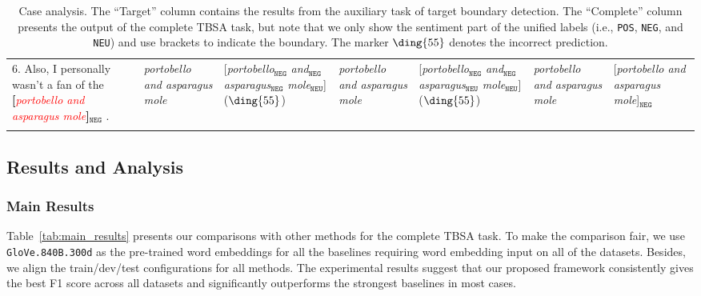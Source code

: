 \documentclass[letterpaper]{article} %
\newcommand{\xmark}{\ding{55}}
\begin{document}
\begin{table}[t]
{\begin{tabular}{@{}L{5.8cm}@{~}|@{~}L{1.8cm}@{~}|@{~}L{2.9cm}@{~}|@{~}L{1.8cm}@{~}|@{~}L{2.9cm}@{~}|@{~}L{1.8cm}@{~}|@{~}L{2.9cm}@{}}
        6. Also, I personally wasn't a fan of the \textbf{[}\textcolor{red}{\textit{portobello and asparagus mole}}\textbf{]}$_{\texttt{NEG}}$ . & \textit{portobello and asparagus mole} & [\textit{portobello}$_{\texttt{NEG}}$ \textit{and}$_{\texttt{NEG}}$ \textit{asparagus}$_{\texttt{NEG}}$ \textit{mole}$_{\texttt{NEU}}$] (${\text{\xmark}}$) & \textit{portobello and asparagus mole} & [\textit{portobello}$_{\texttt{NEG}}$ \textit{and}$_{\texttt{NEG}}$ \textit{asparagus}$_{\texttt{NEU}}$ \textit{mole}$_{\texttt{NEU}}$] (${\text{\xmark}}$) & \textit{portobello and asparagus mole} & [\textit{portobello and asparagus mole}]$_{\texttt{NEG}}$ \\
        \Xhline{3\arrayrulewidth}
    \end{tabular}}
    \caption{Case analysis. The ``Target'' column contains the results from the auxiliary task of target boundary detection. The ``Complete'' column presents the output of the complete TBSA task, but note that we only show the sentiment part of the unified labels (i.e., \texttt{POS}, \texttt{NEG}, and \texttt{NEU}) and use brackets to indicate the boundary. The marker ${\text{\xmark}}$ denotes the incorrect prediction. }
    \label{tab:case_study}
\end{table}

\subsection{Results and Analysis}
\subsubsection{Main Results}
Table~\ref{tab:main_results} presents our comparisons with other methods for the complete TBSA task. To
make the comparison fair, we use \texttt{GloVe.840B.300d} as the pre-trained word embeddings for all the baselines requiring word embedding input on all of the datasets. Besides, we align the train/dev/test configurations for all methods. The experimental results suggest that our proposed framework consistently gives the best F1 score across all datasets and significantly outperforms the strongest baselines in most cases.
\end{document}

